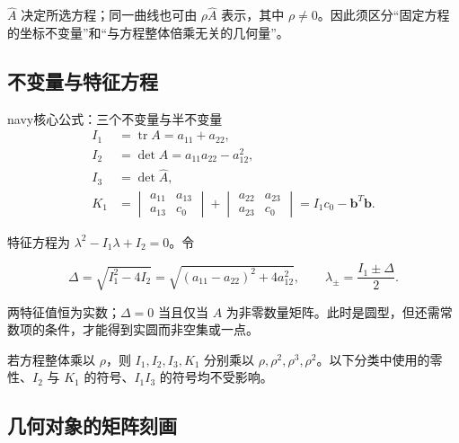 \documentclass[11pt,a4paper]{article}
\begin{document}
\(\widehat A\) 决定所选方程；同一曲线也可由 \(\rho\widehat A\)
表示，其中
\(\rho\ne0\)。因此须区分``固定方程的坐标不变量''和``与方程整体倍乘无关的几何量''。

\subsection{不变量与特征方程}\label{ux4e0dux53d8ux91cfux4e0eux7279ux5f81ux65b9ux7a0b}

\begin{sboxenv}{navy}{核心公式：三个不变量与半不变量}
\begin{equation*}
\begin{aligned}I_1&=\operatorname{tr}A=a_{11}+a_{22},\\ I_2&=\det A=a_{11}a_{22}-a_{12}^2,\\ I_3&=\det\widehat A,\\ K_1&=\begin{vmatrix}a_{11}&a_{13}\\a_{13}&c_0\end{vmatrix}+\begin{vmatrix}a_{22}&a_{23}\\a_{23}&c_0\end{vmatrix}=I_1c_0-\boldsymbol b^T\boldsymbol b.\end{aligned}\tag{1.3}
\end{equation*}

特征方程为 \(\lambda^2-I_1\lambda+I_2=0\)。令

\begin{equation*}
\Delta=\sqrt{I_1^2-4I_2}=\sqrt{(a_{11}-a_{22})^2+4a_{12}^2},\qquad \lambda_\pm=\frac{I_1\pm\Delta}{2}.\tag{1.4}
\end{equation*}

\end{sboxenv}

两特征值恒为实数；\(\Delta=0\) 当且仅当 \(A\)
为非零数量矩阵。此时是圆型，但还需常数项的条件，才能得到实圆而非空集或一点。

若方程整体乘以 \(\rho\)，则 \(I_1,I_2,I_3,K_1\) 分别乘以
\(\rho,\rho^2,\rho^3,\rho^2\)。以下分类中使用的零性、\(I_2\) 与 \(K_1\)
的符号、\(I_1I_3\) 的符号均不受影响。

\subsection{几何对象的矩阵刻画}\label{ux51e0ux4f55ux5bf9ux8c61ux7684ux77e9ux9635ux523bux753b}
\end{document}
